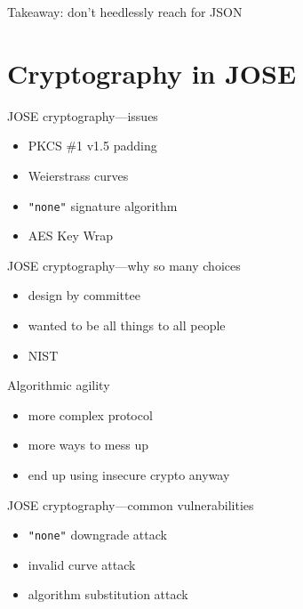 \documentclass[ignorenonframetext,aspectratio=43]{beamer}
\providecommand{\tightlist}{%
  \setlength{\itemsep}{0pt}\setlength{\parskip}{0pt}}
\begin{document}
\begin{frame}[plain]
\huge
Takeaway: don't heedlessly reach for JSON
\end{frame}






\section{Cryptography in JOSE}

\begin{frame}{JOSE cryptography---issues}
\begin{itemize}
\tightlist
\item PKCS \#1 v1.5 padding
\item Weierstrass curves
\item {\tt "none"} signature algorithm
\item AES Key Wrap
\end{itemize}
\end{frame}

\begin{frame}{JOSE cryptography---why so many choices}
\begin{itemize}
\tightlist
\item design by committee
\item wanted to be all things to all people
\item NIST
\end{itemize}
\end{frame}

\begin{frame}{Algorithmic agility}
\begin{itemize}
\tightlist
\item more complex protocol
\item more ways to mess up
\item end up using insecure crypto anyway
\end{itemize}
\end{frame}

\begin{frame}{JOSE cryptography---common vulnerabilities}
\begin{itemize}
\tightlist
\item {\tt "none"} downgrade attack
\item invalid curve attack
\item algorithm substitution attack
\end{itemize}
\end{frame}
\end{document}

